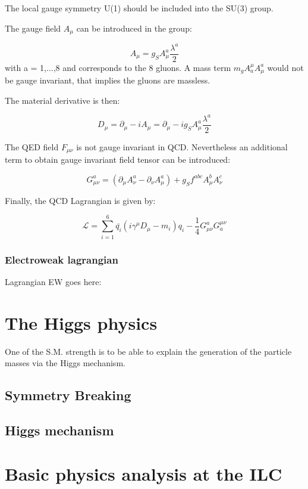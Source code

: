     The local gauge symmetry U(1) should be included into the SU(3) group.
    
    The gauge field $A_{\mu}$ can be introduced in the group:
    
    \begin{equation}
        A_{\mu} = g_S A^a_{\mu}\frac{\lambda^a}{2}
    \end{equation} 
    with a = 1,...,8 and corresponds to the 8 gluons.
    A mass term  $m_g A^{\mu}_a A^a_{\mu}$ would not be gauge invariant, that implies the gluons are massless.

    The material derivative is then:

    \begin{equation}
        D_{\mu} = \partial_{\mu} - i A_{\mu} = \partial_{\mu} - i g_S A^a_{\mu} \frac{\lambda^a}{2}
    \end{equation}

    The QED field $F_{\mu \nu}$ is not gauge invariant in QCD.
    Nevertheless an additional term to obtain gauge invariant field tensor can be introduced:
    
    \begin{equation}
        G^a_{\mu \nu} = \left( \partial_{\mu} A^a_{\nu} - \partial_{\nu} A^a_{\mu} \right) + g_S f^{abc} A^b_{\mu} A^c_{\nu}
    \end{equation} 

    Finally, the QCD Lagrangian is given by:

    \begin{equation}
        \mathcal{L} = \sum_{i=1}^6  \bar{q_i} \left(i \gamma^{\mu}D_{\mu} -m_i \right)q_i - \frac{1}{4} G_{\mu \nu}^{a} G_{a}^{\mu \nu}
    \end{equation}
    
    \subsubsection{Electroweak lagrangian}
   
    Lagrangian EW goes here: 

  \section{The Higgs physics}

	One of the S.M. strength is to be able to explain the generation of the particle masses via the Higgs mechanism.
    
    \subsection{Symmetry Breaking}

    \subsection{Higgs mechanism}

  \section{Basic physics analysis at the ILC}


